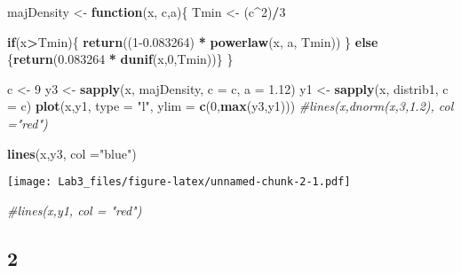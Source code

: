 \documentclass[
]{article}
\newenvironment{Shaded}{\begin{snugshade}}{\end{snugshade}}
\newcommand{\CommentTok}[1]{\textcolor[rgb]{0.56,0.35,0.01}{\textit{#1}}}
\newcommand{\ControlFlowTok}[1]{\textcolor[rgb]{0.13,0.29,0.53}{\textbf{#1}}}
\newcommand{\DataTypeTok}[1]{\textcolor[rgb]{0.13,0.29,0.53}{#1}}
\newcommand{\DecValTok}[1]{\textcolor[rgb]{0.00,0.00,0.81}{#1}}
\newcommand{\FloatTok}[1]{\textcolor[rgb]{0.00,0.00,0.81}{#1}}
\newcommand{\KeywordTok}[1]{\textcolor[rgb]{0.13,0.29,0.53}{\textbf{#1}}}
\newcommand{\NormalTok}[1]{#1}
\newcommand{\OperatorTok}[1]{\textcolor[rgb]{0.81,0.36,0.00}{\textbf{#1}}}
\newcommand{\StringTok}[1]{\textcolor[rgb]{0.31,0.60,0.02}{#1}}
\begin{document}
\begin{Shaded}
\begin{Highlighting}[]
\NormalTok{majDensity <-}\StringTok{ }\ControlFlowTok{function}\NormalTok{(x, c,a)\{}
\NormalTok{  Tmin <-}\StringTok{ }\NormalTok{(c}\OperatorTok{^}\DecValTok{2}\NormalTok{)}\OperatorTok{/}\DecValTok{3}
  
  \ControlFlowTok{if}\NormalTok{(x}\OperatorTok{>}\NormalTok{Tmin)\{}
    \KeywordTok{return}\NormalTok{((}\DecValTok{1}\FloatTok{-0.083264}\NormalTok{) }\OperatorTok{*}\StringTok{ }\KeywordTok{powerlaw}\NormalTok{(x, a, Tmin))}
\NormalTok{  \}}
  \ControlFlowTok{else}\NormalTok{ \{}\KeywordTok{return}\NormalTok{(}\FloatTok{0.083264} \OperatorTok{*}\StringTok{ }\KeywordTok{dunif}\NormalTok{(x,}\DecValTok{0}\NormalTok{,Tmin))\}}
\NormalTok{\}}

\NormalTok{c <-}\StringTok{ }\DecValTok{9}
\NormalTok{y3 <-}\StringTok{ }\KeywordTok{sapply}\NormalTok{(x, majDensity, }\DataTypeTok{c =}\NormalTok{ c, }\DataTypeTok{a =} \FloatTok{1.12}\NormalTok{)}
\NormalTok{y1 <-}\StringTok{ }\KeywordTok{sapply}\NormalTok{(x, distrib1, }\DataTypeTok{c =}\NormalTok{ c)}
\KeywordTok{plot}\NormalTok{(x,y1, }\DataTypeTok{type =} \StringTok{"l"}\NormalTok{, }\DataTypeTok{ylim =} \KeywordTok{c}\NormalTok{(}\DecValTok{0}\NormalTok{,}\KeywordTok{max}\NormalTok{(y3,y1)))}
\CommentTok{#lines(x,dnorm(x,3,1.2), col ="red")}

\KeywordTok{lines}\NormalTok{(x,y3, }\DataTypeTok{col =}\StringTok{"blue"}\NormalTok{)}
\end{Highlighting}
\end{Shaded}

\texttt{[image: Lab3\_files/figure-latex/unnamed-chunk-2-1.pdf]}

\begin{Shaded}
\begin{Highlighting}[]
\CommentTok{#lines(x,y1, col = "red")}
\end{Highlighting}
\end{Shaded}

\hypertarget{section-1}{%
\subsection{2}\label{section-1}}
\end{document}
